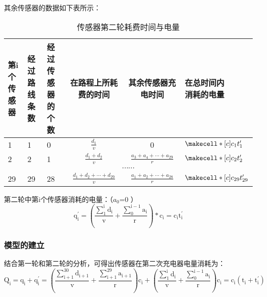 \documentclass{article}
\begin{document}
其余传感器的数据如下表所示：
\vspace{1ex}
\begin{table}[h]
    \begin{center} 
        \begin{tabular}{|p{1.5cm}<{\centering}|p{1.5cm}<{\centering}|p{1.5cm}<{\centering}|c|c|p{2cm}<{\centering}|}
        \hline
        \makecell*[c]{第i个\\传感器} & \makecell*[c]{经过路\\线条数} & \makecell*[c]{经过传感\\器的个数}  & 在路程上所耗费的时间            & 其余传感器充电时间             & \makecell*[c]{在总时间内\\消耗的电量}  \\ 
        \hline
        1      & 1     & 0       & $\frac{d_{1}}{v}$ &  0  &  $\makecell*[c]{c_1 t_1^{\prime}}$   \\ 
        \hline
        2      & 2     & 1       & $\frac{d_{1}+d_{2}}{v}$ & $\frac{a_{3}+a_{4}+\cdots+a_{29}}{r}$  &  $\makecell*[c]{c_2 t^{\prime}_2}$  \\ 
        \hline
        \multicolumn{6}{|c|}{$\cdots \cdots$}                                                                 \\ 
        \hline
        29     & 29      & 28        &  $\frac{d_{1}+d_{2}+\cdots+d_{29}}{v}$    &  $\frac{a_{1}+a_{2}+\cdots+a_{28}}{r}$  &  $\makecell*[c]{c_{29} t_{29}^{\prime}}$ \\
        \hline
        \end{tabular}
    \end{center}
\caption{传感器第二轮耗费时间与电量}
\end{table}

第二轮中第i个传感器消耗的电量：（$a_0$=0 ）
\begin{equation}
    \mathrm{q_{i}^{\prime}=\left(\frac{\sum_{1}^{i} d_{i}}{v}+\frac{\sum_{0}^{i-1} a_{i}}{r}\right) * c_{i}=c_{i} t_{i}^{\prime}}
    \tag{19}
\end{equation}

\subsubsection{模型的建立}
结合第一轮和第二轮的分析，可得出传感器在第二次充电器电量消耗为：
\begin{equation}
    \mathrm{Q_{i}=q_{i}+q_{i}^{\prime}=\left(\frac{\sum_{i+1}^{30} d_{i+1}}{v}+\frac{\sum_{i+1}^{29} a_{i+1}}{r}\right) c_{i}+\left(\frac{\sum_{1}^{i} d_{i}}{v}+\frac{\sum_{0}^{i-1} a_{i}}{r}\right) c_{i}=c_{i}\left(t_{i}+t_{i}^{\prime}\right)}
    \tag{20}
\end{equation}
\end{document}
